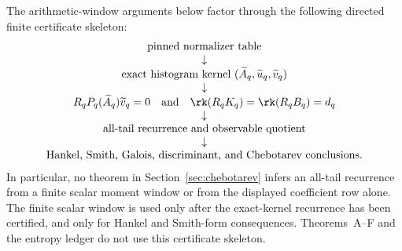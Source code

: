 \begin{proposition}
\label{prop:arithmetic-window-dependency-skeleton}
The arithmetic-window arguments below factor through the following directed
finite certificate skeleton:
\[
\begin{array}{c}
\text{pinned normalizer table}\\
\downarrow\\
\text{exact histogram kernel }
(\widetilde A_q,\widetilde u_q,\widetilde v_q)\\
\downarrow\\
R_qP_q(\widetilde A_q)\widetilde v_q=0
\quad\text{and}\quad
\rk(R_qK_q)=\rk(R_qB_q)=d_q\\
\downarrow\\
\text{all-tail recurrence and observable quotient}\\
\downarrow\\
\text{Hankel, Smith, Galois, discriminant, and Chebotarev conclusions.}
\end{array}
\]
In particular, no theorem in Section~\ref{sec:chebotarev} infers an all-tail
recurrence from a finite scalar moment window or from the displayed coefficient
row alone.  The finite scalar window is used only after the exact-kernel
recurrence has been certified, and only for Hankel and Smith-form consequences.
Theorems~A--F and the entropy ledger do not use this certificate skeleton.
\end{proposition}

